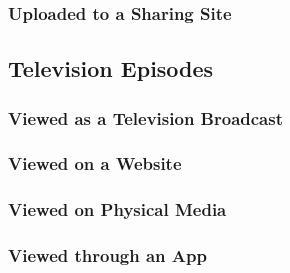 \documentclass{ltxdockit}
\begin{document}
\subsubsection{Uploaded to a Sharing Site} %
\label{sub:uploaded_to_a_sharing_site}
\begin{refsection}
	\printbibliography[heading=none]
\end{refsection}
\subsection{Television Episodes} %
\label{sec:television_episodes}
\subsubsection{Viewed as a Television Broadcast} %
\label{sub:viewed_as_a_television_broadcast}
\begin{refsection}
	\printbibliography[heading=none]
\end{refsection}
\subsubsection{Viewed on a Website} %
\label{sub:tv_viewed_on_a_website}
\begin{refsection}
	\printbibliography[heading=none]
\end{refsection}
\subsubsection{Viewed on Physical Media} %
\label{sub:tv_viewed_on_physical_media}
\begin{refsection}
	\printbibliography[heading=none]
\end{refsection}
\subsubsection{Viewed through an App} %
\label{sub:tv_viewed_through_an_app}
\begin{refsection}
	\printbibliography[heading=none]
\end{refsection}
\end{document}
